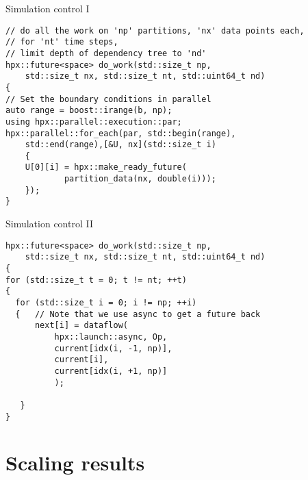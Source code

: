 \documentclass[\classoption]{beamer}
\begin{document}
\begin{frame}[fragile]{Simulation control I}

\begin{lstlisting}
// do all the work on 'np' partitions, 'nx' data points each, 
// for 'nt' time steps, 
// limit depth of dependency tree to 'nd'
hpx::future<space> do_work(std::size_t np, 
    std::size_t nx, std::size_t nt, std::uint64_t nd)
{
// Set the boundary conditions in parallel
auto range = boost::irange(b, np);
using hpx::parallel::execution::par;
hpx::parallel::for_each(par, std::begin(range), 
    std::end(range),[&U, nx](std::size_t i)
    {
    U[0][i] = hpx::make_ready_future(
    	    partition_data(nx, double(i)));
    });  
}
\end{lstlisting}

\end{frame}

\begin{frame}[fragile]{Simulation control II}

\begin{lstlisting}
hpx::future<space> do_work(std::size_t np, 
    std::size_t nx, std::size_t nt, std::uint64_t nd)
{
for (std::size_t t = 0; t != nt; ++t)
{
  for (std::size_t i = 0; i != np; ++i)
  {   // Note that we use async to get a future back
      next[i] = dataflow(
          hpx::launch::async, Op,
          current[idx(i, -1, np)], 
          current[i], 
          current[idx(i, +1, np)]
          );

   }
}
\end{lstlisting}

\end{frame}


\section{Scaling results}
\end{document}
